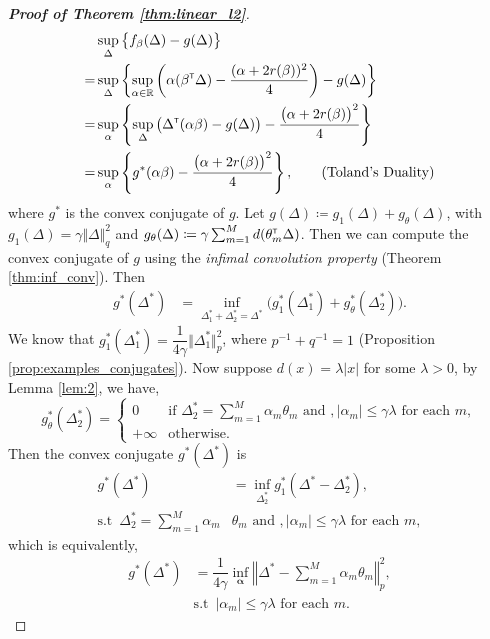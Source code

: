 \documentclass[12pt]{article}
\begin{document}
\begin{proof}[\textbf{Proof of Theorem \ref{thm:linear_l2}}]
\begin{align*}
\label{eqn:duality}
    &\sup_{\Delta} \big\{f_\beta(\Delta) -g(\Delta) \big\}\\
    =&\sup_{\Delta} \left\{ \sup_{\alpha\in \mathbb{R}} \left(\alpha (\beta^{\scriptscriptstyle \sf T}\Delta) - \dfrac{(\alpha+2r(\beta))^2}{4}\right) - g(\Delta)\right\}\\
    =&\sup_\alpha \left\{ \sup_\Delta \big(\Delta ^{\scriptscriptstyle \sf T}(\alpha \beta)-g(\Delta)\big) - \dfrac{\big(\alpha + 2r(\beta)\big)^2}{4} \right\}\\
    =&\sup_\alpha \left\{ g^*(\alpha\beta) - \dfrac{\big(\alpha + 2r(\beta)\big)^2}{4}\right\}, \tag{Toland's Duality}
\end{align*}where $g^*$ is the convex conjugate of $g$. Let $g(\Delta) \coloneqq g_1(\Delta) +g_\theta(\Delta)$, with $g_1(\Delta) = \gamma \Vert \Delta\Vert_q^2$ and $g_\theta(\Delta) \coloneqq \gamma\sum_{m=1}^M d(\theta_m^{\scriptscriptstyle \sf T} \Delta)$. Then we can compute the convex conjugate of $g$ using the \textit{infimal convolution property} (Theorem \ref{thm:inf_conv}). Then \begin{align*}
    g^*(\Delta^*) &=\inf_{\Delta^*_1+\Delta^*_2 = \Delta^*} \big( g_1^*(\Delta_1^*) + g_\theta^*(\Delta_2^*)\big). 
\end{align*}
We know that $g_1^*(\Delta_1^*) = \dfrac{1}{4\gamma}\Vert\Delta_1^*\Vert_p^2$, where $p^{-1}+q^{-1}=1$ (Proposition \ref{prop:examples_conjugates}). Now suppose $d(x) = \lambda|x|$ for some $\lambda>0$, by Lemma \ref{lem:2}, we have,\[
    g_\theta^*(\Delta_2^*) = \begin{cases}
        0 &\text{if } \Delta_2^* = \sum_{m=1}^M \alpha_m \theta_m \text{ and }, |\alpha_m| \leq \gamma\lambda \text{ for each }m, \\
        +\infty & \text{otherwise.}
    \end{cases}
    \]
Then the convex conjugate $g^*(\Delta^*)$ is \begin{align*}
    g^*(\Delta^*) &= \inf_{\Delta_2^*} g_1^*(\Delta^*-\Delta_2^*),\\
    \text{s.t }\,\Delta_2^* = \sum_{m=1}^M \alpha_m &\theta_m \text{ and }, |\alpha_m| \leq \gamma\lambda \text{ for each }m,
\end{align*}which is equivalently,
\begin{align*}
    g^*(\Delta^*) &= \dfrac{1}{4\gamma}\inf_{\boldsymbol{\alpha}}\left\Vert \Delta^* - \sum_{m=1}^M\alpha_m\theta_m\right\Vert_p^2,\\
    &\text{s.t }\,|\alpha_m| \leq \gamma\lambda \text{ for each }m.

\end{align*}
\end{proof}
\end{document}
